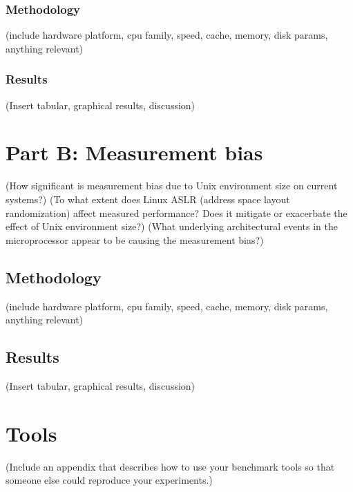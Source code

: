 \documentclass{article}
\begin{document}
\subsubsection{Methodology}
(include hardware platform, cpu family, speed, cache, memory, disk params, anything relevant)
\subsubsection{Results}
(Insert tabular, graphical results, discussion)

\newpage
\section{Part B: Measurement bias}
(How significant is measurement bias due to Unix environment size on current systems?)
(To what extent does Linux ASLR (address space layout randomization) affect measured performance? Does it mitigate or exacerbate the effect of Unix environment size?)
(What underlying architectural events in the microprocessor appear to be causing the measurement bias?)
\subsection{Methodology}
(include hardware platform, cpu family, speed, cache, memory, disk params, anything relevant)
\subsection{Results}
(Insert tabular, graphical results, discussion)

\newpage
\appendix

\section{Tools}
(Include an appendix that describes how to use your benchmark tools so that someone else could reproduce your experiments.)
\end{document}
